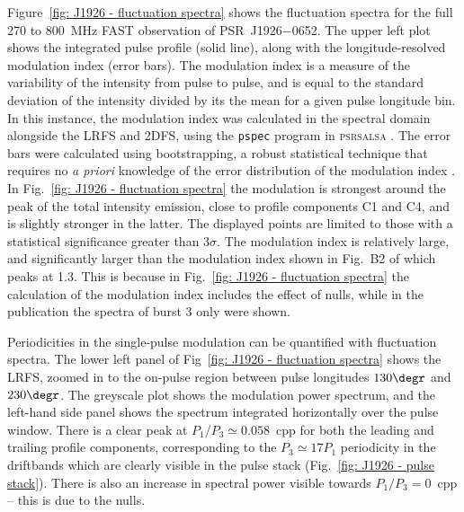 Figure~\ref{fig: J1926 - fluctuation spectra} shows the fluctuation spectra for the full 270 to 800~MHz FAST observation of PSR~J1926$-$0652. The upper left plot shows the integrated pulse profile (solid line), along with the longitude-resolved modulation index (error bars). The modulation index is a measure of the variability of the intensity from pulse to pulse, and is equal to the standard deviation of the intensity divided by its the mean for a given pulse longitude bin. In this instance, the modulation index was calculated in the spectral domain alongside the LRFS and 2DFS, using the \texttt{pspec} program in \textsc{psrsalsa} \citep{Wxxx2016}. The error bars were calculated using bootstrapping, a robust statistical technique that requires no \textit{a priori} knowledge of the error distribution of the modulation index \citep[e.g.][]{WJxx2012}. In Fig.~\ref{fig: J1926 - fluctuation spectra} the modulation is strongest around the peak of the total intensity emission, close to profile components C1 and C4, and is slightly stronger in the latter. The displayed points are limited to those with a statistical significance greater than $3\sigma$. The modulation index is relatively large, and significantly larger than the modulation index shown in Fig.~B2 of \citet{ZLH+2019} which peaks at 1.3. This is because in Fig.~\ref{fig: J1926 - fluctuation spectra} the calculation of the modulation index includes the effect of nulls, while in the publication the spectra of burst 3 only were shown.

Periodicities in the single-pulse modulation can be quantified with fluctuation spectra. The lower left panel of Fig~\ref{fig: J1926 - fluctuation spectra} shows the LRFS, zoomed in to the on-pulse region between pulse longitudes $130\degr$ and $230\degr$. The greyscale plot shows the modulation power spectrum, and the left-hand side panel shows the spectrum integrated horizontally over the pulse window. There is a clear peak at $P_1/P_3 \simeq 0.058$~cpp for both the leading and trailing profile components, corresponding to the $P_3 \simeq 17 P_1$ periodicity in the driftbands which are clearly visible in the pulse stack (Fig.~\ref{fig: J1926 - pulse stack}). There is also an increase in spectral power visible towards $P_1/P_3 = 0$~cpp -- this is due to the nulls.

